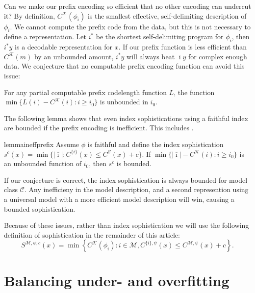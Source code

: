 \documentclass{style/llncs}
\newcommand{\M}{\mathscr M}
\newcommand{\C}{\mathscr C}
\newcommand{\K}{\mathscr K}
\begin{document}
Can we make our prefix encoding so efficient that no other encoding can undercut it? By definition, $C^{\K}(\phi_i)$ is the smallest effective, self-delimiting description of $\phi_i$. We cannot compute the prefix code from the data, but this is not necessary to define a representation. Let $i^*$ be the shortest self-delimiting program for $\phi_i$, then $i^*y$ is a decodable representation for $x$. If our prefix function is less efficient than $C^\K(m)$ by an unbounded amount, $i^*y$ will always beat $\bar\imath y$ for complex enough data. We conjecture that no computable prefix encoding function can avoid this issue:
\begin{conjecture}
For any partial computable prefix codelength function $L$, the function $\min\{L(i)-C^\K(i):i\ge i_0\}$
is unbounded in $i_0$.
\end{conjecture}
The following lemma shows that even index sophistications using a faithful index are bounded if the prefix encoding is inefficient. This includes \cite{adriaans2012facticity}.
\begin{restatable}{lemma}{ineffprefix}
Assume $\phi$ is faithful and define the index sophistication $s^c(x)=\min\{|\bar\imath|:C^{\{i\}}(x)\le C^{\C}(x)+c\}$.
If $\min\{|\bar\imath|-C^\K(i):i\ge i_0\}$ is an unbounded function of $i_0$, then $s^c$ is bounded.\label{lemma:prefix-inefficiency}
\end{restatable}
If our conjecture is correct, the index sophistication is always bounded for model class $\C$. Any inefficieny in the model description, and a second represention using a universal model with a more efficient model description will win, causing a bounded sophistication.

Because of these issues, rather than index sophistication we will use the following definition of sophistication in the remainder of this article: 
\begin{equation}\label{eq:soph}
S^{\M,\psi,c}(x)=\min\left\{C^\K(\phi_i):i\in\M,C^{\{i\},\psi}(x)\le C^{\M,\psi}(x)+c\right\}.
\end{equation}

\section{Balancing under- and overfitting}
\label{section:balance}
\end{document}
